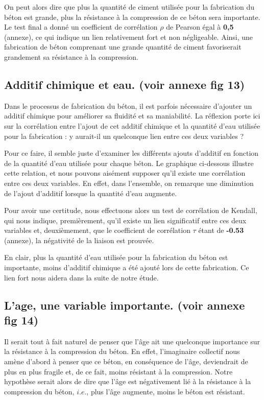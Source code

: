 \documentclass[
  12pt,
]{article}
\begin{document}
On peut alors dire que plus la quantité de ciment utilisée pour la
fabrication du béton est grande, plus la résistance à la compression de
ce béton sera importante. Le test final a donné un coefficient de
corrélation \(\rho\) de Pearson égal à \textbf{0,5} (annexe), ce qui
indique un lien relativement fort et non négligeable. Ainsi, une
fabrication de béton comprenant une grande quantité de ciment
favoriserait grandement sa résistance à la compression.

\subsection{Additif chimique et eau. (voir annexe fig
13)}\label{additif-chimique-et-eau.-voir-annexe-fig-13}

Dans le processus de fabrication du béton, il est parfois nécessaire
d'ajouter un additif chimique pour améliorer sa fluidité et sa
maniabilité. La réflexion porte ici sur la corrélation entre l'ajout de
cet additif chimique et la quantité d'eau utilisée pour la fabrication :
y aurait-il un quelconque lien entre ces deux variables ?

Pour ce faire, il semble juste d'examiner les différents ajouts
d'additif en fonction de la quantité d'eau utilisée pour chaque béton.
Le graphique ci-dessous illustre cette relation, et nous pouvons
aisément supposer qu'il existe une corrélation entre ces deux variables.
En effet, dans l'ensemble, on remarque une diminution de l'ajout
d'additif lorsque la quantité d'eau augmente.

Pour avoir une certitude, nous effectuons alors un test de corrélation
de Kendall, qui nous indique, premièrement, qu'il existe un lien
significatif entre ces deux variables et, deuxièmement, que le
coefficient de corrélation \(\tau\) étant de \textbf{-0.53} (annexe), la
négativité de la liaison est prouvée.

En clair, plus la quantité d'eau utilisée pour la fabrication du béton
est importante, moins d'additif chimique a été ajouté lors de cette
fabrication. Ce lien fort nous aidera dans la suite de notre étude.

\subsection{L'age, une variable importante. (voir annexe fig
14)}\label{lage-une-variable-importante.-voir-annexe-fig-14}

Il serait tout à fait naturel de penser que l'âge ait une quelconque
importance sur la résistance à la compression du béton. En effet,
l'imaginaire collectif nous amène d'abord à penser que ce béton, en
conséquence de l'âge, deviendrait de plus en plus fragile et, de ce
fait, moins résistant à la compression. Notre hypothèse serait alors de
dire que l'âge est négativement lié à la résistance à la compression du
béton, \(i.e.\), plus l'âge augmente, moins le béton est résistant.
\end{document}
